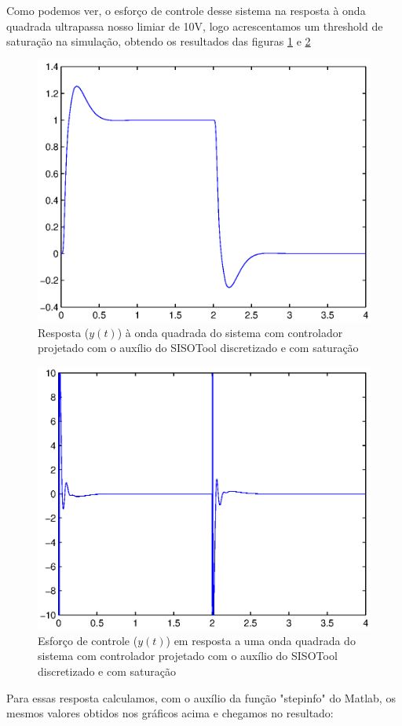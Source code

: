 \documentclass{article}
\begin{document}
Como podemos ver, o esforço de controle desse sistema na resposta à onda quadrada ultrapassa nosso limiar de 10V, logo acrescentamos um threshold de saturação na simulação, obtendo os resultados das figuras \ref{fig:stepSISOsat} e \ref{fig:stepuSISOsat}
\begin{figure}[H]
	\centering
	\includegraphics[width=0.8\linewidth]{stepSISOsat}
	\caption{Resposta ($y(t)$) à onda quadrada do sistema com controlador projetado com o auxílio do SISOTool discretizado e com saturação}
	\label{fig:stepSISOsat}
\end{figure}
\begin{figure}[H]
	\centering
	\includegraphics[width=0.8\linewidth]{stepuSISOsat}
	\caption{Esforço de controle ($y(t)$) em resposta a uma onda quadrada do sistema com controlador projetado com o auxílio do SISOTool discretizado e com saturação}
	\label{fig:stepuSISOsat}
\end{figure}
Para essas resposta calculamos, com o auxílio da função "stepinfo" do Matlab, os mesmos valores obtidos nos gráficos acima e chegamos no resultado:
\end{document}
